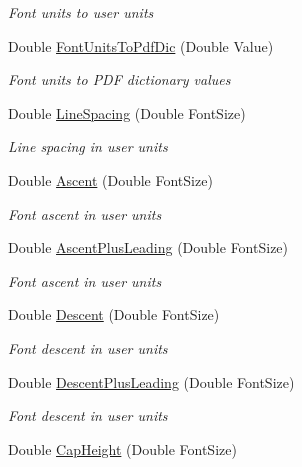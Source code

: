 \begin{DoxyCompactItemize}
\begin{DoxyCompactList}\small\item\em Font units to user units \end{DoxyCompactList}\item 
Double \hyperlink{class_pdf_file_writer_1_1_pdf_font_a1dd94779dd73041e866848e83db624a1}{Font\+Units\+To\+Pdf\+Dic} (Double Value)
\begin{DoxyCompactList}\small\item\em Font units to P\+DF dictionary values \end{DoxyCompactList}\item 
Double \hyperlink{class_pdf_file_writer_1_1_pdf_font_ab608b19209b32501aa5f8cac40f7ae9c}{Line\+Spacing} (Double Font\+Size)
\begin{DoxyCompactList}\small\item\em Line spacing in user units \end{DoxyCompactList}\item 
Double \hyperlink{class_pdf_file_writer_1_1_pdf_font_a5a3787ebaf402bf59d57dd9a9fa83a9f}{Ascent} (Double Font\+Size)
\begin{DoxyCompactList}\small\item\em Font ascent in user units \end{DoxyCompactList}\item 
Double \hyperlink{class_pdf_file_writer_1_1_pdf_font_abdd3c48b88e289f6584fe24a1179ac79}{Ascent\+Plus\+Leading} (Double Font\+Size)
\begin{DoxyCompactList}\small\item\em Font ascent in user units \end{DoxyCompactList}\item 
Double \hyperlink{class_pdf_file_writer_1_1_pdf_font_aa6bd733169644719e247d8caefc2faf1}{Descent} (Double Font\+Size)
\begin{DoxyCompactList}\small\item\em Font descent in user units \end{DoxyCompactList}\item 
Double \hyperlink{class_pdf_file_writer_1_1_pdf_font_a3e7a70174369aab3c3ed21dedbf9ccbf}{Descent\+Plus\+Leading} (Double Font\+Size)
\begin{DoxyCompactList}\small\item\em Font descent in user units \end{DoxyCompactList}\item 
Double \hyperlink{class_pdf_file_writer_1_1_pdf_font_a6d8af3fc79fdae648335c01ba4ddd4f0}{Cap\+Height} (Double Font\+Size)

\end{DoxyCompactItemize}
